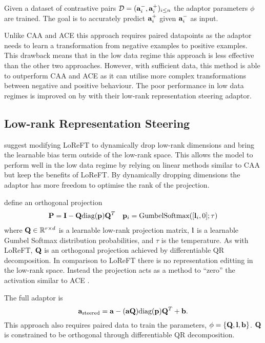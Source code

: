 Given a dataset of contrastive pairs $\mathcal{D} = (\mathbf{a}_i^-, \mathbf{a}_i^+)_{i\le n}$ the adaptor parameters $\phi$ are trained.
The goal is to accurately predict $\mathbf{a}_i^+$ given $\mathbf{a}_i^-$ as input.

Unlike CAA \cite{caa} and ACE \cite{ace} this approach requires paired datapoints as the adaptor needs to learn a transformation from negative examples to positive examples.
This drawback means that in the low data regime this approach is less effective than the other two approaches.
However, with sufficient data, this method is able to outperform CAA and ACE as it can utilise more complex transformations between negative and positive behaviour.
The poor performance in low data regimes is improved on by \citet{steering-clear} with their low-rank representation steering adaptor.

\subsection{Low-rank Representation Steering}
\label{lorest}

\citet{steering-clear} suggest modifying LoReFT \cite{reft} to dynamically drop low-rank dimensions and bring the learnable bias term outside of the low-rank space.
This allows the model to perform well in the low data regime by relying on linear methods similar to CAA \cite{caa} but keep the benefits of LoReFT.
By dynamically dropping dimensions the adaptor has more freedom to optimise the rank of the projection.

\citet{steering-clear} define an orthogonal projection
\begin{align*}
    \mathbf{P} = \mathbf{I} - \mathbf{Q}\text{diag}(\mathbf{p})\mathbf{Q}^T && \mathbf{p}_i = \text{GumbelSoftmax}([\mathbf{l}_i,0];\tau)
\end{align*}
where $\mathbf{Q} \in \mathbb{R}^{r\times d}$ is a learnable low-rank projection matrix, $\mathbf{l}$ is a learnable Gumbel Softmax distribution probabilities, and $\tau$ is the temperature.
As with LoReFT, $\mathbf{Q}$ is an orthogonal projection achieved by differentiable QR decomposition.
In comparison to LoReFT  there is no representation editting in the low-rank space.
Instead the projection acts as a method to ``zero'' the activation similar to ACE \cite{ace}.

The full adaptor is
\begin{equation}
    \mathbf{a}_\text{steered} = \mathbf{a} - (\mathbf{a}\mathbf{Q})\text{diag}(\mathbf{p})\mathbf{Q}^T + \mathbf{b}.
\end{equation}
This approach also requires paired data to train the parameters, $\phi = \{\mathbf{Q}, \mathbf{l}, \mathbf{b}\}$.
$\mathbf{Q}$ is constrained to be orthogonal through differentiable QR decomposition.


